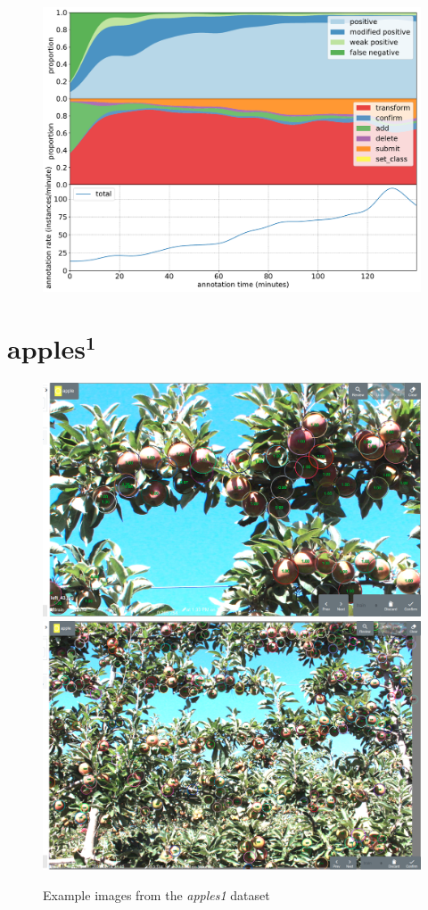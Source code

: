 \begin{figure}[!h]
\centering
\includegraphics[width=1.0\linewidth]{charts/action_annotations/penguins.pdf}
\caption{  }
\label{fig:penguin_annotation}
\end{figure}



\pagebreak
\section{$\mathbf{apples^1}$}
\label{sec:apples1_details}

\begin{figure}[!h]
  \includegraphics[width=0.475\linewidth]{figures/annotation/screenshots/apples_big.png}
  \hfill
  \includegraphics[width=0.45\linewidth]{figures/annotation/screenshots/apples_small.png}
\caption{Example images from the \emph{apples1} dataset}
\label{fig:apples1_dataset}  
\end{figure}

